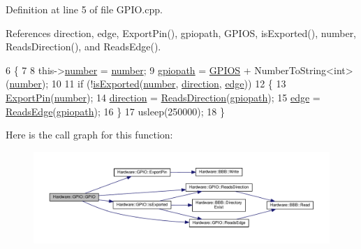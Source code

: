 Definition at line 5 of file G\+P\+I\+O.\+cpp.



References direction, edge, Export\+Pin(), gpiopath, G\+P\+I\+O\+S, is\+Exported(), number, Reads\+Direction(), and Reads\+Edge().


\begin{DoxyCode}
6     \{
7 
8         this->\hyperlink{class_hardware_1_1_g_p_i_o_a1671a87bb70911b0a6a29019a068cf96}{number} = \hyperlink{class_hardware_1_1_g_p_i_o_a1671a87bb70911b0a6a29019a068cf96}{number};
9         \hyperlink{class_hardware_1_1_g_p_i_o_ac47062ed6aba52b9e8506e1575bf5061}{gpiopath} = \hyperlink{_g_p_i_o_8h_ad3c9654be00e07ca084884963ae36830}{GPIOS} + NumberToString<int>(\hyperlink{class_hardware_1_1_g_p_i_o_a1671a87bb70911b0a6a29019a068cf96}{number});
10 
11         \textcolor{keywordflow}{if} (!\hyperlink{class_hardware_1_1_g_p_i_o_a423f9ac92259cacdca0c82c3ee9b1cdd}{isExported}(\hyperlink{class_hardware_1_1_g_p_i_o_a1671a87bb70911b0a6a29019a068cf96}{number}, \hyperlink{class_hardware_1_1_g_p_i_o_a77e93e4f6650507fdc4898d272d540e7}{direction}, \hyperlink{class_hardware_1_1_g_p_i_o_adf15f74f053069029e99934e28c109e0}{edge}))
12         \{
13             \hyperlink{class_hardware_1_1_g_p_i_o_a1a880bee633c9c5227cb36d2d6c63a52}{ExportPin}(\hyperlink{class_hardware_1_1_g_p_i_o_a1671a87bb70911b0a6a29019a068cf96}{number});
14             \hyperlink{class_hardware_1_1_g_p_i_o_a77e93e4f6650507fdc4898d272d540e7}{direction} = \hyperlink{class_hardware_1_1_g_p_i_o_a875d4f95ff3e6a70196660faa0477cf5}{ReadsDirection}(\hyperlink{class_hardware_1_1_g_p_i_o_ac47062ed6aba52b9e8506e1575bf5061}{gpiopath});
15             \hyperlink{class_hardware_1_1_g_p_i_o_adf15f74f053069029e99934e28c109e0}{edge} = \hyperlink{class_hardware_1_1_g_p_i_o_ac5a3c6d1a0ce58a0b2ee0752623810e4}{ReadsEdge}(\hyperlink{class_hardware_1_1_g_p_i_o_ac47062ed6aba52b9e8506e1575bf5061}{gpiopath});
16         \}
17         usleep(250000);
18     \}
\end{DoxyCode}


Here is the call graph for this function\+:\nopagebreak
\begin{figure}[H]
\begin{center}
\leavevmode
\includegraphics[width=350pt]{class_hardware_1_1_g_p_i_o_afa29c38f1b07c2db68572ac0c60ed787_cgraph}
\end{center}
\end{figure}


